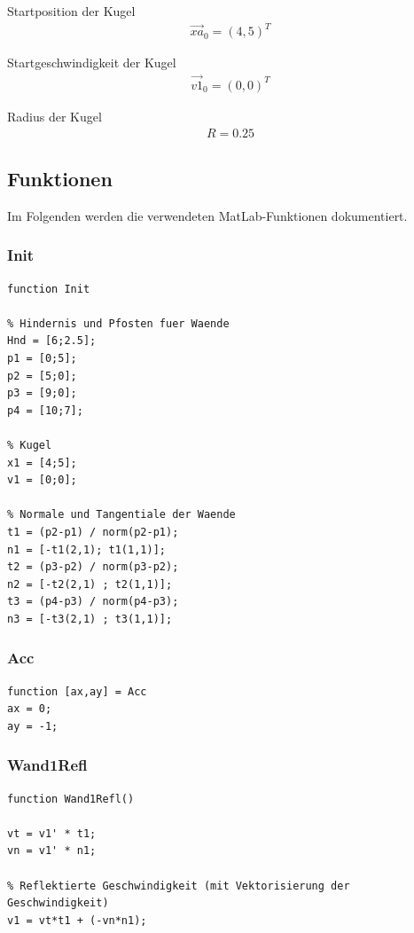 \documentclass[]{scrartcl}
\begin{document}
Startposition der Kugel
\begin{align}
\vec{xa}_{0} = (4,5)^T
\end{align}

Startgeschwindigkeit der Kugel
\begin{align}
\vec{v1}_{0} = (0,0)^T
\end{align}

Radius der Kugel
\begin{align}
R = 0.25
\end{align}

\subsection{Funktionen}
Im Folgenden werden die verwendeten MatLab-Funktionen dokumentiert.

\subsubsection{Init}
\begin{lstlisting}
function Init

% Hindernis und Pfosten fuer Waende
Hnd = [6;2.5];
p1 = [0;5];
p2 = [5;0];
p3 = [9;0];
p4 = [10;7];

% Kugel
x1 = [4;5];
v1 = [0;0];

% Normale und Tangentiale der Waende
t1 = (p2-p1) / norm(p2-p1);
n1 = [-t1(2,1); t1(1,1)];
t2 = (p3-p2) / norm(p3-p2);
n2 = [-t2(2,1) ; t2(1,1)];
t3 = (p4-p3) / norm(p4-p3);
n3 = [-t3(2,1) ; t3(1,1)];
\end{lstlisting}

\subsubsection{Acc}
\begin{lstlisting}
function [ax,ay] = Acc
ax = 0;
ay = -1;
\end{lstlisting}

\subsubsection{Wand1Refl}
\begin{lstlisting}
function Wand1Refl()

vt = v1' * t1;
vn = v1' * n1;

% Reflektierte Geschwindigkeit (mit Vektorisierung der Geschwindigkeit)
v1 = vt*t1 + (-vn*n1); 
\end{lstlisting}
\end{document}
